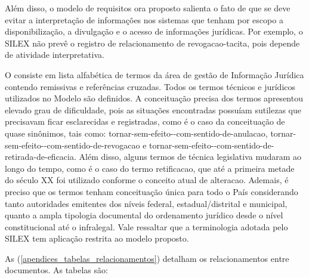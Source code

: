 \documentclass[a4paper,11pt,openright,twoside,english,brazil]{abntex2}
\begin{document}
Além disso, o modelo de requisitos ora proposto salienta o fato de que se deve
evitar a interpretação de informações nos sistemas que tenham por escopo a
disponibilização, a divulgação e o acesso de informações jurídicas. Por exemplo,
o SILEX não prevê o registro de relacionamento de \gls{revogacao-tacita}, pois
depende de atividade interpretativa.

O \hyperref[cap_glossario]{\glossaryname} consiste em lista alfabética de termos
da área de gestão de Informação Jurídica contendo remissivas e referências
cruzadas. Todos os termos técnicos e jurídicos utilizados no Modelo são
definidos. A conceituação precisa dos termos apresentou elevado grau de
dificuldade, pois as situações encontradas possuíam sutilezas que precisavam
ficar esclarecidas e registradas, como é o caso da conceituação de quase
sinônimos, tais como: \gls{tornar-sem-efeito--com-sentido-de-anulacao},
\gls{tornar-sem-efeito--com-sentido-de-revogacao} e
\gls{tornar-sem-efeito--com-sentido-de-retirada-de-eficacia}. Além disso, alguns
termos de técnica legislativa mudaram ao longo do tempo, como é o caso do termo
\gls{retificacao}, que até a primeira metade do século XX foi utilizado conforme
o conceito atual de \gls{alteracao}. Ademais, é preciso que os termos tenham
conceituação única para todo o País considerando tanto autoridades emitentes dos
níveis federal, estadual/distrital e municipal, quanto a ampla tipologia
documental do ordenamento jurídico desde o nível constitucional até o
infralegal. Vale ressaltar que a terminologia adotada pelo SILEX tem aplicação
restrita ao modelo proposto.

As 
(\autoref{apendices_tabelas_relacionamentos}) detalham os relacionamentos entre
documentos. As tabelas são: 
\end{document}
